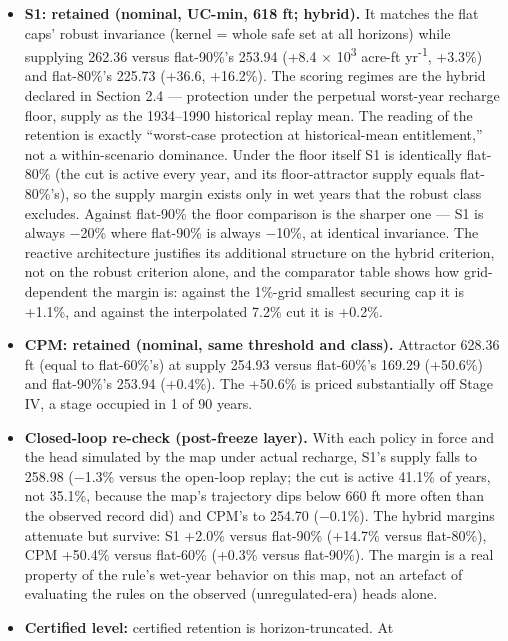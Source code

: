 \begin{itemize}
\tightlist
\item
  \textbf{S1: retained (nominal, UC-min, 618 ft; hybrid).} It matches
  the flat caps' robust invariance (kernel = whole safe set at all
  horizons) while supplying 262.36 versus flat-90\%'s 253.94 (+8.4 \ensuremath{\times} 10\textsuperscript{3}
  acre-ft yr\textsuperscript{-1}, +3.3\%) and flat-80\%'s 225.73 (+36.6, +16.2\%). The
  scoring regimes are the hybrid declared in Section 2.4 --- protection
  under the perpetual worst-year recharge floor, supply as the
  1934--1990 historical replay mean. The reading of the retention is
  exactly ``worst-case protection at historical-mean entitlement,'' not
  a within-scenario dominance. Under the floor itself S1 is identically
  flat-80\% (the cut is active every year, and its floor-attractor
  supply equals flat-80\%'s), so the supply margin exists only in wet
  years that the robust class excludes. Against flat-90\% the floor
  comparison is the sharper one --- S1 is always \ensuremath{-}20\% where flat-90\%
  is always \ensuremath{-}10\%, at identical invariance. The reactive architecture
  justifies its additional structure on the hybrid criterion, not on the
  robust criterion alone, and the comparator table shows how
  grid-dependent the margin is: against the 1\%-grid smallest securing
  cap it is +1.1\%, and against the interpolated 7.2\% cut it is +0.2\%.
\item
  \textbf{CPM: retained (nominal, same threshold and class).} Attractor
  628.36 ft (equal to flat-60\%'s) at supply 254.93 versus flat-60\%'s
  169.29 (+50.6\%) and flat-90\%'s 253.94 (+0.4\%). The +50.6\% is
  priced substantially off Stage IV, a stage occupied in 1 of 90 years.
\item
  \textbf{Closed-loop re-check (post-freeze layer).} With each policy in
  force and the head simulated by the map under actual recharge, S1's
  supply falls to 258.98 (\ensuremath{-}1.3\% versus the open-loop replay; the cut is
  active 41.1\% of years, not 35.1\%, because the map's trajectory dips
  below 660 ft more often than the observed record did) and CPM's to
  254.70 (\ensuremath{-}0.1\%). The hybrid margins attenuate but survive: S1 +2.0\%
  versus flat-90\% (+14.7\% versus flat-80\%), CPM +50.4\% versus
  flat-60\% (+0.3\% versus flat-90\%). The margin is a real property of
  the rule's wet-year behavior on this map, not an artefact of
  evaluating the rules on the observed (unregulated-era) heads alone.
\item
  \textbf{Certified level:} certified retention is horizon-truncated. At

\end{itemize}

